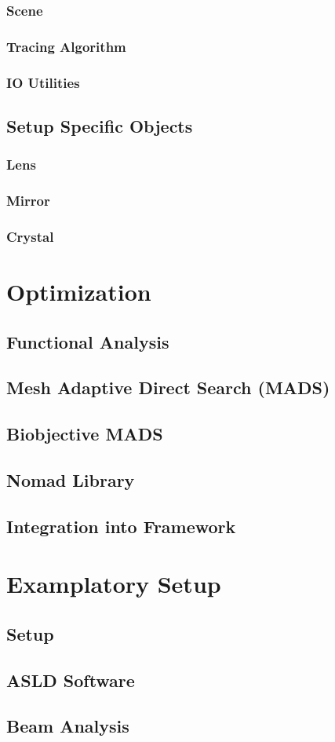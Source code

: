 \documentclass[a4paper,10pt]{article}
\begin{document}
    \subsubsection{Scene}
    \subsubsection{Tracing Algorithm}
    \subsubsection{IO Utilities}
    
    \subsection{Setup Specific Objects} \label{sec:specific_objects}
    \subsubsection{Lens}
    \subsubsection{Mirror}
    \subsubsection{Crystal}

    \section{Optimization}
    \subsection{Functional Analysis}
    \subsection{Mesh Adaptive Direct Search (MADS)}
    \subsection{Biobjective MADS}
    \subsection{Nomad Library}
    \subsection{Integration into Framework}

    \section{Examplatory Setup}
    \subsection{Setup}
    \subsection{ASLD Software}
    \subsection{Beam Analysis}

    \newpage

    
    
\end{document}
